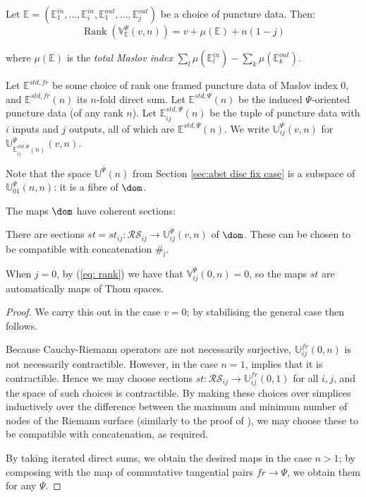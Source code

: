 \documentclass{TPmod}
\def\bE{\mathbb{E}}
\def\bU{\mathbb{U}}
\def\bV{\mathbb{V}}
\newcommand{\cR}{\mathcal{R}}
\newcommand{\cS}{\mathcal{S}}
\numberwithin{equation}{section}
\begin{document}
\begin{lem}[{\cite[Section 3.3]{PS2}}]
    Let $\bE=(\bE^{in}_1, \ldots, \bE^{in}_i, \bE^{out}_1, \ldots, \bE^{out}_j)$ be a choice of puncture data. Then:
    \begin{equation}\label{eq: rank}
        \operatorname{Rank}(\bV^\Psi_{\bE}(v,n)) = v+\mu(\bE) + n(1-j)
    \end{equation}
    
    where $\mu(\bE)$ is the \emph{total Maslov index} $\sum_l\mu(\bE^{in}_l) - \sum_k\mu(\bE^{out}_k)$.
\end{lem}

Let $\bE^{std, fr}$ be some choice of rank one framed puncture data of Maslov index 0, and $\bE^{std, fr}(n)$ its $n$-fold direct sum. Let $\bE^{std, \Psi}(n)$ be the induced $\Psi$-oriented puncture data (of any rank $n$). Let $\bE^{std, \Psi}_{ij}(n)$ be the tuple of puncture data with $i$ inputs and $j$ outputs, all of which are $\bE^{std, \Psi}(n)$. We write $\bU^\Psi_{ij}(v, n)$ for $\bU^\Psi_{\bE^{std,\Psi}_{ij}(n)}(v,n)$.

\begin{rmk}\label{rmk: fix dom case}
    Note that the space $\bU^\Psi(n)$ from Section \ref{sec:abst disc fix case} is a subspace of $\bU^\Psi_{01}(n, n)$: it is a fibre of $\dom$.
\end{rmk}

The maps $\dom$ have coherent sections:
\begin{lem}\label{lem: cr sect}

    There are sections $st=st_{ij}: \cR\cS_{ij} \to \bU^\Psi_{ij}(v, n)$ of $\dom$.
    These can be chosen to be compatible with concatenation $\#_l$.

\end{lem}
When $j=0$, by (\ref{eq: rank}) we have that $\bV^\Psi_{ij}(0,n) = 0$, so the maps $st$ are automatically maps of Thom spaces.
\begin{proof}
    We carry this out in the case $v=0$; by stabilising the general case then follows.

    Because Cauchy-Riemann operators are not necessarily surjective, $\bU^{fr}_{ij}(0,n)$ is not necessarily contractible. However, in the case $n=1$, \cite[Theorem C.1.10]{McDuff-Salamon} implies that it is contractible. Hence we may choose sections $st: \cR\cS_{ij} \to \bU^{fr}_{ij}(0,1)$ for all $i,j$, and the space of such choices is contractible. By making these choices over simplices inductively over the difference between the maximum and minimum number of nodes of the Riemann surface (similarly to the proof of \cite[Lemma 3.18]{PS2}), we may choose these to be compatible with concatenation, as required.

    By taking iterated direct sums, we obtain the desired maps in the case $n > 1$; by composing with the map of commutative tangential pairs $fr \to \Psi$, we obtain them for any $\Psi$.
\end{proof}
\end{document}
